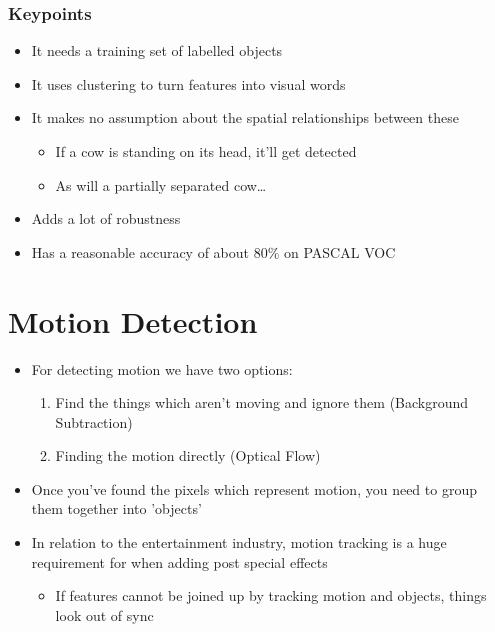 \documentclass[a4paper]{article}
\begin{document}
\subsubsection{Keypoints}
\label{sec-3-5-1}
\begin{itemize}
\item It needs a training set of labelled objects
\item It uses clustering to turn features into visual words
\item It makes no assumption about the spatial relationships between these
\begin{itemize}
\item If a cow is standing on its head, it'll get detected
\item As will a partially separated cow\ldots{}
\end{itemize}
\item Adds a lot of robustness
\item Has a reasonable accuracy of about 80\% on PASCAL VOC
\end{itemize}

\section{Motion Detection}
\label{sec-4}
\begin{itemize}
\item For detecting motion we have two options:
\begin{enumerate}
\item Find the things which aren't moving and ignore them (Background Subtraction)
\item Finding the motion directly (Optical Flow)
\end{enumerate}
\item Once you've found the pixels which represent motion, you need to group them together into 'objects'
\item In relation to the entertainment industry, motion tracking is a huge requirement for when adding post special effects
\begin{itemize}
\item If features cannot be joined up by tracking motion and objects, things look out of sync
\end{itemize}
\end{itemize}
\end{document}
